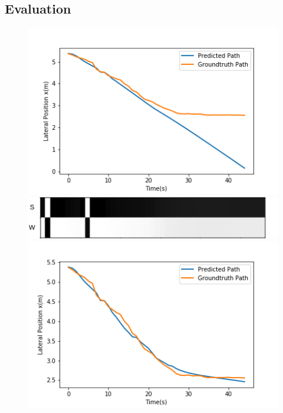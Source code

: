 \documentclass[10pt,twocolumn,letterpaper]{article}
\begin{document}
    \subsection{Evaluation}
    \begin{figure}[t]
        \begin{center}
            \includegraphics[width=0.95\linewidth]{images/lat_pos0.png}
        \end{center}
        \begin{center}
            \includegraphics[width=0.85\linewidth]{images/m_bar_walk.png}
        \end{center}
        \begin{center}
            \includegraphics[width=0.95\linewidth]{images/lat_pos1.png}

\end{center}
\end{figure}
\end{document}
